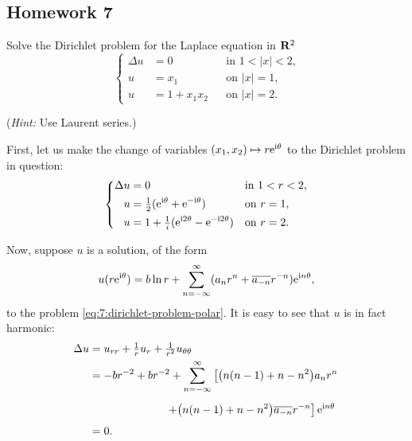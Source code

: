 \subsection{Homework 7}
\begin{problem}
  Solve the Dirichlet problem for the Laplace equation in \(\mathbf{R}^2\)
  \[
    \left\{
      \begin{aligned}
        \Delta u&=0&&\text{in \(1<|x|<2\),}\\
        u&=x_1&&\text{on \(|x|=1\),}\\
        u&=1+x_1x_2&&\text{on \(|x|=2\).}
      \end{aligned}
    \right.
  \]

  \noindent (\emph{Hint:} Use Laurent series.)
\end{problem}
\begin{solution*}
  First, let us make the change of variables \((x_1,x_2)\mapsto
  r\mathrm{e}^{\mathrm{i}\theta}\) to the Dirichlet problem in question:
  \begin{equation}
    \label{eq:7:dirichlet-problem-polar}
    \left\{
      \begin{aligned}
        \Delta u&=0&&\text{in \(1<r<2\),}\\
        u&=\tfrac{1}{2}(\mathrm{e}^{\mathrm{i}\theta}+\mathrm{e}^{-\mathrm{i}\theta})&&\text{on \(r=1\),}\\
        u&=1+\tfrac{1}{i}(\mathrm{e}^{\mathrm{i} 2\theta}-\mathrm{e}^{-\mathrm{i} 2\theta})&&\text{on \(r=2\).}
      \end{aligned}
    \right.
  \end{equation}

  Now, suppose \(u\) is a solution, of the form
  \[
    u(r\rme^{\rmi\theta})=%
    b\ln r%
    +\sum_{n=-\infty}^\infty (a_nr^n+\overline{a_{-n}}r^{-n})\rme^{\rmi n\theta},
  \]
  to the problem \eqref{eq:7:dirichlet-problem-polar}. It is easy to see
  that \(u\) is in fact harmonic:
  \begin{align*}
    \Delta u%
    &=u_{rr}+\tfrac{1}{r}u_r+\tfrac{1}{r^2}u_{\theta\theta}\\
    &=-br^{-2}+br^{-2}+\sum_{n=-\infty}^\infty
      \left[\bigl(n(n-1)+n-n^2\bigr) a_nr^n\right.\\
    &\phantom{{}={}-\frac{b}{r^2}+\frac{b}{r^2}+}
      \left.+\bigl(n(n-1)+n-n^2\bigr)\overline{a_{-n}}r^{-n}\right]\rme^{\rmi
      n\theta}\\
    &=0.
  \end{align*}


\end{solution*}
